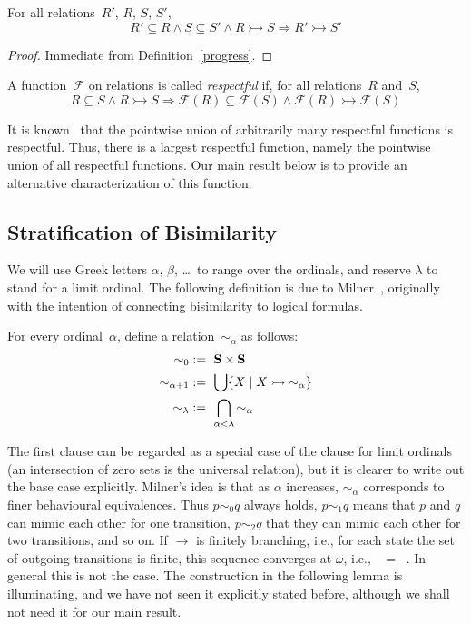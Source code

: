 \documentclass{CSML}
\theoremstyle{definition}
\newcommand{\progress}{\rightarrowtail}
\newcommand{\F}{\mathcal{F}}
\begin{document}
\begin{lem}
\label{progress-monotone}
For all relations~$R'$, $R$, $S$, $S'$,
$$R' \subseteq R \wedge S \subseteq S' \wedge R \progress S
  \Longrightarrow R' \progress S'$$
\end{lem}

\begin{proof}
Immediate from Definition~\ref{progress}.
\end{proof}

\begin{defi}[Respectfulness]
\label{respectfulness}
A function~$\F$ on relations is called \emph{respectful} if, for all
relations~$R$ and~$S$,
$$R \subseteq S \wedge R \progress S \Longrightarrow \F(R) \subseteq
\F(S) \wedge \F(R) \progress \F(S)$$
\end{defi}

It is known~\cite{Sangiorgi1998} that the pointwise union of
arbitrarily many respectful functions is respectful.  Thus, there is a
largest respectful function, namely the pointwise union of all
respectful functions.  Our main result below is to provide an
alternative characterization of this function.

\subsection{Stratification of Bisimilarity}

We will use Greek letters $\alpha$, $\beta$, \ldots\ to range over the
ordinals, and reserve $\lambda$ to stand for a limit ordinal. The
following definition is due to Milner~\cite{Milner1989}, originally
with the intention of connecting bisimilarity to logical formulas.

\begin{defi}
\label{def:stratifications}
For every ordinal~$\alpha$, define a relation~$\sim_\alpha$ as
follows:
\begin{align*}
\mathop{\sim_0}        &:=\ {\bf S} \times {\bf S}\\
\mathop{\sim_{\alpha+1}} &:=\ \bigcup \{X \mid X \progress \mathop{\sim_\alpha}\}\\
\sim_\lambda            &:=\ \bigcap_{\alpha < \lambda} \mathop{\sim_\alpha}
\end{align*}
\end{defi}

The first clause can be regarded as a special case of the clause for
limit ordinals (an intersection of zero sets is the universal
relation), but it is clearer to write out the base case explicitly.
Milner's idea is that as $\alpha$ increases, $\sim_\alpha$ corresponds
to finer behavioural equivalences.  Thus $p \sim_0 q$ always holds, $p
\sim_1 q$ means that $p$ and $q$ can mimic each other for one
transition, $p \sim_2 q$ that they can mimic each other for two
transitions, and so on.  If $\longrightarrow$ is finitely branching,
i.e., for each state the set of outgoing transitions is finite, this
sequence converges at $\omega$, i.e., $\mathop{\sim_\omega} =
\mathop{\sim_{\omega+1}}$.  In general this is not the case.  The
construction in the following lemma is illuminating, and we have not
seen it explicitly stated before, although we shall not need it for
our main result.
\end{document}
